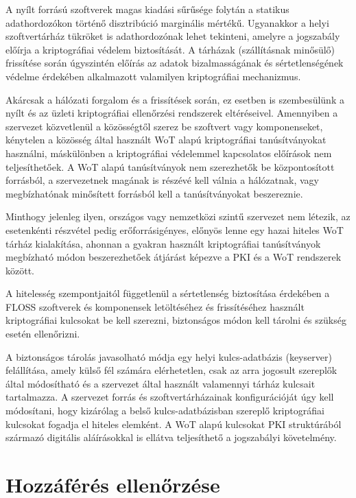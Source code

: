 \documentclass[12pt,magyar,a4paper,oneside]{scrreprt}
\begin{document}
A nyílt forrású szoftverek magas kiadási sűrűsége folytán a statikus
adathordozókon történő disztribúció marginális mértékű. Ugyanakkor a
helyi szoftvertárház tükröket is adathordozónak lehet tekinteni, amelyre
a jogszabály előírja a kriptográfiai védelem biztosítását. A tárházak
(szállításnak minősülő) frissítése során úgyszintén előírás az adatok
bizalmasságának és sértetlenségének védelme érdekében alkalmazott
valamilyen kriptográfiai mechanizmus.

Akárcsak a hálózati forgalom és a frissítések során, ez esetben is
szembesülünk a nyílt és az üzleti kriptográfiai ellenőrzési rendszerek
eltéréseivel. Amennyiben a szervezet közvetlenül a közösségtől szerez be
szoftvert vagy komponenseket, kénytelen a közösség által használt WoT
alapú kriptográfiai tanúsítványokat használni, máskülönben a
kriptográfiai védelemmel kapcsolatos előírások nem teljesíthetőek. A WoT
alapú tanúsítványok nem szerezhetők be központosított forrásból, a
szervezetnek magának is részévé kell válnia a hálózatnak, vagy
megbízhatónak minősített forrásból kell a tanúsítványokat beszereznie.

Minthogy jelenleg ilyen, országos vagy nemzetközi szintű szervezet nem
létezik, az esetenkénti részvétel pedig erőforrásigényes, előnyös lenne
egy hazai hiteles WoT tárház kialakítása, ahonnan a gyakran használt
kriptográfiai tanúsítványok megbízható módon beszerezhetőek átjárást
képezve a PKI és a WoT rendszerek között.

A hitelesség szempontjaitól függetlenül a sértetlenség biztosítása
érdekében a FLOSS szoftverek és komponensek letöltéséhez és
frissítéséhez használt kriptográfiai kulcsokat be kell szerezni,
biztonságos módon kell tárolni és szükség esetén ellenőrizni.

A biztonságos tárolás javasolható módja egy helyi kulcs-adatbázis
(keyserver) felállítása, amely külső fél számára elérhetetlen, csak az
arra jogosult szereplők által módosítható és a szervezet által használt
valamennyi tárház kulcsait tartalmazza. A szervezet forrás és
szoftvertárházainak konfigurációját úgy kell módosítani, hogy kizárólag
a belső kulcs-adatbázisban szereplő kriptográfiai kulcsokat fogadja el
hiteles elemként. A WoT alapú kulcsokat PKI struktúrából származó
digitális aláírásokkal is ellátva teljesíthető a jogszabályi
követelmény.

\hypertarget{hozzuxe1fuxe9ruxe9s-ellenux151rzuxe9se}{%
\section{Hozzáférés
ellenőrzése}\label{hozzuxe1fuxe9ruxe9s-ellenux151rzuxe9se}}
\end{document}
